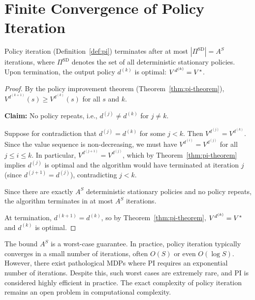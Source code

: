 \documentclass[11pt,a4paper]{article}
\begin{document}

\section{Finite Convergence of Policy Iteration}
\label{sec:pi-convergence}

\begin{theorem}
\label{thm:pi-finite}
Policy iteration (Definition~\ref{def:pi}) terminates after at most
$|\Pi^{\mathrm{SD}}| = A^S$ iterations, where
$\Pi^{\mathrm{SD}}$ denotes the set of all deterministic stationary
policies. Upon termination, the output policy $d^{(k)}$ is optimal:
$V^{d^{(k)}} = V^*$.
\end{theorem}

\begin{proof}
By the policy improvement theorem (Theorem~\ref{thm:pi-theorem}),
$V^{d^{(k+1)}}(s) \geq V^{d^{(k)}}(s)$ for all $s$ and $k$.

\textbf{Claim:} No policy repeats, i.e., $d^{(j)} \neq d^{(k)}$
for $j \neq k$.

Suppose for contradiction that $d^{(j)} = d^{(k)}$ for some
$j < k$. Then $V^{d^{(j)}} = V^{d^{(k)}}$. Since
the value sequence is non-decreasing, we must have
$V^{d^{(i)}} = V^{d^{(j)}}$ for all $j \leq i \leq k$.
In particular, $V^{d^{(j+1)}} = V^{d^{(j)}}$, which by
Theorem~\ref{thm:pi-theorem} implies $d^{(j)}$ is optimal and the
algorithm would have terminated at iteration $j$ (since
$d^{(j+1)} = d^{(j)}$), contradicting $j < k$.

Since there are exactly $A^S$ deterministic stationary policies and
no policy repeats, the algorithm terminates in at most $A^S$
iterations.

At termination, $d^{(k+1)} = d^{(k)}$, so by
Theorem~\ref{thm:pi-theorem}, $V^{d^{(k)}} = V^*$ and
$d^{(k)}$ is optimal.
\end{proof}

\begin{warning}[title={The $A^S$ Bound Is Rarely Tight}]
The bound $A^S$ is a worst-case guarantee. In practice, policy
iteration typically converges in a small number of iterations,
often $O(S)$ or even $O(\log S)$. However, there exist pathological
MDPs where PI requires an exponential number of iterations. Despite
this, such worst cases are extremely rare, and PI is considered
highly efficient in practice. The exact complexity of policy
iteration remains an open problem in computational complexity.
\end{warning}
\end{document}
